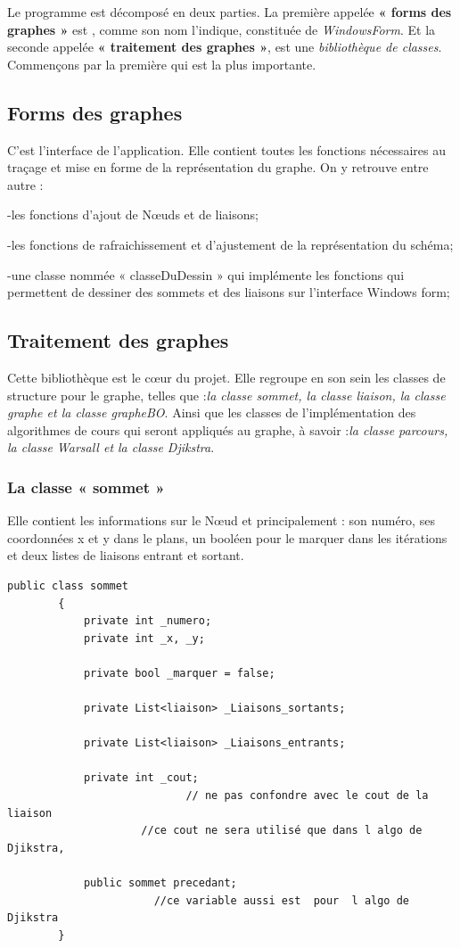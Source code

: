 \documentclass[11pt,twoside,a4paper]{article}
\begin{document}
Le programme est décomposé en deux parties. La première appelée {\bf « forms des graphes »} est , comme son nom l’indique, constituée de {\it WindowsForm}. Et la seconde appelée  {\bf « traitement des graphes »}, est une {\it bibliothèque de classes}.
Commençons par la première qui est la plus importante.


\subsection{Forms des graphes}

C’est l’interface de l’application. Elle contient toutes les fonctions nécessaires au traçage et mise en forme de la représentation du graphe. On y retrouve entre autre :

-les fonctions d’ajout de Nœuds et de liaisons;

-les fonctions de rafraichissement et d’ajustement de la représentation du schéma;

-une classe nommée « classeDuDessin » qui implémente les fonctions qui permettent de dessiner des sommets et des liaisons sur l’interface Windows form;


\subsection{Traitement des graphes}

Cette bibliothèque est le cœur du projet. Elle regroupe  en son sein les classes de structure pour le graphe, telles que :{\it la classe sommet, la classe liaison, la classe graphe et la classe grapheBO}. Ainsi que les classes de l’implémentation des algorithmes de cours qui seront appliqués au graphe, à savoir :{\it la classe parcours, la classe Warsall et la classe Djikstra}.

\subsubsection{La classe « sommet »}
Elle contient les informations sur le Nœud et  principalement : son numéro, ses coordonnées x et y dans le plans, un booléen pour le marquer dans les itérations et deux listes de liaisons entrant et sortant.
\begin{verbatim}
public class sommet
        {
            private int _numero;
            private int _x, _y;
           
            private bool _marquer = false;

            private List<liaison> _Liaisons_sortants;

            private List<liaison> _Liaisons_entrants;

            private int _cout; 
                            // ne pas confondre avec le cout de la liaison
                     //ce cout ne sera utilisé que dans l algo de Djikstra, 

            public sommet precedant;
                       //ce variable aussi est  pour  l algo de Djikstra
        }
\end{verbatim}
\end{document}
